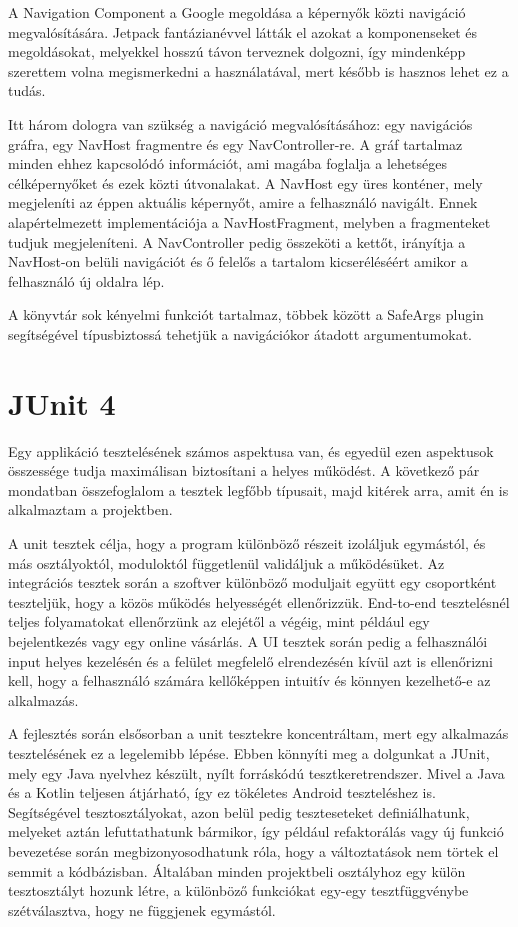 A Navigation Component a Google megoldása a képernyők közti navigáció megvalósítására. Jetpack fantázianévvel látták el azokat a komponenseket és megoldásokat, melyekkel hosszú távon terveznek dolgozni, így mindenképp szerettem volna megismerkedni a használatával, mert később is hasznos lehet ez a tudás. 

Itt három dologra van szükség a navigáció megvalósításához: egy navigációs gráfra, egy NavHost fragmentre és egy NavController-re. A gráf tartalmaz minden ehhez kapcsolódó információt, ami magába foglalja a lehetséges célképernyőket és ezek közti útvonalakat. A NavHost egy üres konténer, mely megjeleníti az éppen aktuális képernyőt, amire a felhasználó navigált. Ennek alapértelmezett implementációja a NavHostFragment, melyben a fragmenteket tudjuk megjeleníteni. A NavController pedig összeköti a kettőt, irányítja a NavHost-on belüli navigációt és ő felelős a tartalom kicseréléséért amikor a felhasználó új oldalra lép. 

A könyvtár sok kényelmi funkciót tartalmaz, többek között a SafeArgs plugin segítségével típusbiztossá tehetjük a navigációkor átadott argumentumokat. \cite{Navigation}

\section{JUnit 4}

Egy applikáció tesztelésének számos aspektusa van, és egyedül ezen aspektusok összessége tudja maximálisan biztosítani a helyes működést. A következő pár mondatban összefoglalom a tesztek legfőbb típusait, majd kitérek arra, amit én is alkalmaztam a projektben.

 A unit tesztek célja, hogy a program különböző részeit izoláljuk egymástól, és más osztályoktól, moduloktól függetlenül validáljuk a működésüket. Az integrációs tesztek során a szoftver különböző moduljait együtt egy csoportként teszteljük, hogy a közös működés helyességét ellenőrizzük.\cite{IntegrationTest} End-to-end tesztelésnél teljes folyamatokat ellenőrzünk az elejétől a végéig, mint például egy bejelentkezés vagy egy online vásárlás.\cite{EndtoEndTest} A UI tesztek során pedig a felhasználói input helyes kezelésén és a felület megfelelő elrendezésén kívül azt is ellenőrizni kell, hogy a felhasználó számára kellőképpen intuitív és könnyen kezelhető-e az alkalmazás.\cite{UITest}

A fejlesztés során elsősorban a unit tesztekre koncentráltam, mert egy alkalmazás tesztelésének ez a legelemibb lépése. Ebben könnyíti meg a dolgunkat a JUnit, mely egy Java nyelvhez készült, nyílt forráskódú tesztkeretrendszer. Mivel a Java és a Kotlin teljesen átjárható, így ez tökéletes Android teszteléshez is. Segítségével tesztosztályokat, azon belül pedig teszteseteket definiálhatunk, melyeket aztán lefuttathatunk bármikor, így például refaktorálás vagy új funkció bevezetése során megbizonyosodhatunk róla, hogy a változtatások nem törtek el semmit a kódbázisban. Általában minden projektbeli osztályhoz egy külön tesztosztályt hozunk létre, a különböző funkciókat egy-egy tesztfüggvénybe szétválasztva, hogy ne függjenek egymástól.


